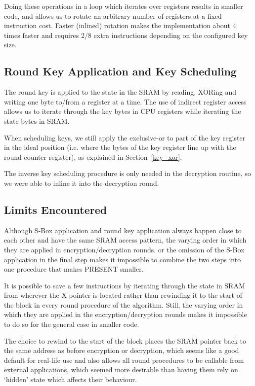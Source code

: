 \documentclass[11pt]{llncs2e} %
\begin{document}
Doing these operations in a loop which iterates over registers results in smaller code, and allows us to rotate an arbitrary number of registers at a fixed instruction cost.
Faster (inlined) rotation makes the implementation about 4 times faster and requires 2/8 extra instructions depending on the configured key size.

\subsection{Round Key Application and Key Scheduling}
The round key is applied to the state in the SRAM by reading, XORing and writing one byte to/from a register at a time.
The use of indirect register access allows us to iterate through the key bytes in CPU registers while iterating the state bytes in SRAM.

When scheduling keys, we still apply the exclusive-or to part of the key register in the ideal position (i.e. where the bytes of the key register line up with the round counter register), as explained in Section~\ref{key_xor}.

The inverse key scheduling procedure is only needed in the decryption routine, so we were able to inline it into the decryption round.

\subsection{Limits Encountered}
Although S-Box application and round key application always happen close to each other and have the same SRAM access pattern, the varying order in which they are applied in encryption/decryption rounds, or the omission of the S-Box application in the final step makes it impossible to combine the two steps into one procedure that makes PRESENT smaller.

It is possible to save a few instructions by iterating through the state in SRAM from wherever the X pointer is located rather than rewinding it to the start of the block in every round procedure of the algorithm. Still, the varying order in which they are applied in the encryption/decryption rounds makes it impossible to do so for the general case in smaller code.

The choice to rewind to the start of the block places the SRAM pointer back to the same address as before encryption or decryption, which seems like a good default for real-life use and also allows all round procedures to be callable from external applications, which seemed more desirable than having them rely on `hidden' state which affects their behaviour.
\end{document}
